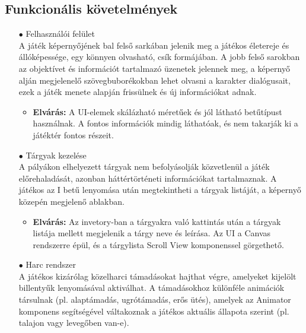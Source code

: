 \documentclass[
]{thesis-ekf}
\theoremstyle{definition}
\theoremstyle{remark}
\begin{document}
\subsection{Funkcionális követelmények}
\begin{itemize}
	\item[$\bullet$] Felhasználói felület \\A játék képernyőjének bal felső sarkában jelenik meg a játékos életereje és állóképessége, egy könnyen olvasható, csík formájában. A jobb felső sarokban az objektívet és információt tartalmazó üzenetek jelennek meg, a képernyő alján megjelenelő szövegbuborékokban lehet olvasni a karakter dialógusait, ezek a játék menete alapján frissülnek és új információkat adnak.
	\begin{itemize}
		\item \textbf{Elvárás:} A UI-elemek skálázható méretűek és jól látható betűtípust használnak. A fontos információk mindig láthatóak, és nem takarják ki a játéktér fontos részeit.
	\end{itemize}
	\item[$\bullet$]Tárgyak kezelése\\A pályákon elhelyezett tárgyak nem befolyásolják közvetlenül a játék előrehaladását, azonban háttértörténeti információkat tartalmaznak. A játékos az I betű lenyomása után megtekintheti a tárgyak listáját, a képernyő közepén megjelenő ablakban.
	\begin{itemize}
		\item \textbf{Elvárás:} Az invetory-ban a tárgyakra való kattintás után a tárgyak listája mellett megjelenik a tárgy neve és leírása. Az UI a Canvas rendszerre épül, és a tárgylista Scroll View komponenssel görgethető.
	\end{itemize}
	\item[$\bullet$] Harc rendszer\\ A játékos kizárólag közelharci támadásokat hajthat végre, amelyeket
	kijelölt billentyűk lenyomásával aktiválhat. A támadásokhoz különféle animációk társulnak (pl. alaptámadás, ugrótámadás, erős ütés), amelyek az Animator komponens segítségével váltakoznak a játékos aktuális állapota szerint (pl. talajon vagy levegőben van-e).
	

\end{itemize}
\end{document}

